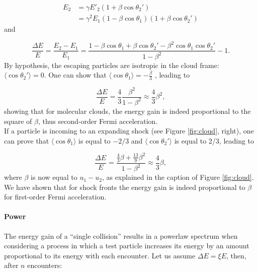 \begin{equation}
\begin{split}
E_2 &= \gamma E'_2 \left(1+\beta \cos \theta_2'\right)\\
&=\gamma^2 E_1 \left(1-\beta \cos \theta_1\right) \left( 1 + \beta \cos \theta_2'\right)
\end{split}
\end{equation}
and

\begin{equation}
\frac{\Delta E}{E} = \frac{E_2 -E_1}{E_1} = \frac{1 - 
\beta \cos \theta_1 + \beta \cos \theta_2' - \beta^2 \cos \theta_1 \cos \theta_2'}{1-\beta^2} -1.
\end{equation}
By hypothesis, the escaping particles are isotropic in the cloud frame: $\langle \cos \theta_2' \rangle = 0$. One can show that $\langle \cos \theta_1 \rangle = -\frac{\beta}{3}$ \cite{Gaisser:2016uoy}, leading to

\begin{equation}
\frac{\Delta E}{E} = \frac{4}{3} \frac{\beta^2}{1-\beta^2} \approx \frac{4}{3} \beta^2,
\end{equation}
showing that for molecular clouds, the energy gain is indeed proportional to the square of $\beta$, thus second-order Fermi acceleration.\\
\newline
If a particle is incoming to an expanding shock (see Figure \ref{fig:cloud}, right), one can prove that $\langle \cos \theta_1\rangle$ is equal to $-2/3$ and $\langle \cos \theta_2'\rangle$ is equal to 2/3, leading to

\begin{equation}
\frac{\Delta E}{E} = \frac{\frac{4}{3}\beta + \frac{13}{9}\beta^2}{1-\beta^2} \approx \frac{4}{3} \beta,
\end{equation}
where $\beta$ is now equal to $u_1 -u_2$, as explained in the caption of Figure \ref{fig:cloud}. We have shown that for shock fronts the energy gain is indeed proportional to $\beta$ for first-order Fermi acceleration. 

\paragraph{Power}
\label{para:power}
The energy gain of a ``single collision'' results in a powerlaw spectrum when considering a process in which a test particle increases its energy by an amount proportional to its energy with each encounter. Let us assume $\Delta E = \xi E$, then, after $n$ encounters:

